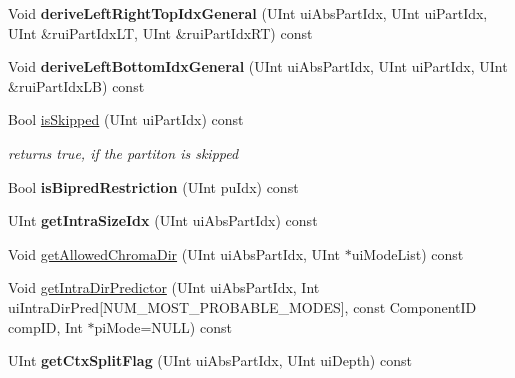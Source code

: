 \begin{DoxyCompactItemize}
\item 
\mbox{\label{class_t_com_data_c_u_a2f258a8403ca4d8e251196a770ce9a6f}} 
Void {\bfseries derive\+Left\+Right\+Top\+Idx\+General} (U\+Int ui\+Abs\+Part\+Idx, U\+Int ui\+Part\+Idx, U\+Int \&rui\+Part\+Idx\+LT, U\+Int \&rui\+Part\+Idx\+RT) const
\item 
\mbox{\label{class_t_com_data_c_u_aa40fd3bf93496e8df75e86c584da17df}} 
Void {\bfseries derive\+Left\+Bottom\+Idx\+General} (U\+Int ui\+Abs\+Part\+Idx, U\+Int ui\+Part\+Idx, U\+Int \&rui\+Part\+Idx\+LB) const
\item 
Bool \hyperlink{class_t_com_data_c_u_a301d22fe94ab54f1422865deaea26c35}{is\+Skipped} (U\+Int ui\+Part\+Idx) const
\begin{DoxyCompactList}\small\item\em returns true, if the partiton is skipped \end{DoxyCompactList}\item 
\mbox{\label{class_t_com_data_c_u_ab3ea10344f2001391c3afc69612e7427}} 
Bool {\bfseries is\+Bipred\+Restriction} (U\+Int pu\+Idx) const
\item 
\mbox{\label{class_t_com_data_c_u_a13d4359a1586f5def75b919796f8f521}} 
U\+Int {\bfseries get\+Intra\+Size\+Idx} (U\+Int ui\+Abs\+Part\+Idx) const
\item 
Void \hyperlink{class_t_com_data_c_u_a1cdabaa658f73f1ad84b576ef2458a6e}{get\+Allowed\+Chroma\+Dir} (U\+Int ui\+Abs\+Part\+Idx, U\+Int $\ast$ui\+Mode\+List) const
\item 
Void \hyperlink{class_t_com_data_c_u_a5d87e0e97be56079d6ce68dc4c2b8803}{get\+Intra\+Dir\+Predictor} (U\+Int ui\+Abs\+Part\+Idx, Int ui\+Intra\+Dir\+Pred\mbox{[}N\+U\+M\+\_\+\+M\+O\+S\+T\+\_\+\+P\+R\+O\+B\+A\+B\+L\+E\+\_\+\+M\+O\+D\+ES\mbox{]}, const Component\+ID comp\+ID, Int $\ast$pi\+Mode=N\+U\+LL) const
\item 
\mbox{\label{class_t_com_data_c_u_a77670aaf66e58b41485c2c330065c19f}} 
U\+Int {\bfseries get\+Ctx\+Split\+Flag} (U\+Int ui\+Abs\+Part\+Idx, U\+Int ui\+Depth) const
\item 
\mbox{\label{class_t_com_data_c_u_a3647c4fd5b1787f3c9ab7a0e6f7b8a15}} 

\end{DoxyCompactItemize}
